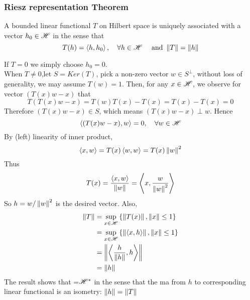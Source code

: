 \subsubsection{Riesz representation Theorem}\label{Riesz representation theory}
\begin{theorem}\rm
	A bounded linear functional $T$ on Hilbert space \hbs is uniquely associated with a vector $h_0\in \mathscr{H}$ in the sense that
	$$
		T(h)=\left<{h},{h_0}\right>,\quad\forall h\in\mathscr{H}\quad\text{ and  }\left\|{T}\right\|=\left\|{h}\right\|
	$$
	\begin{pf}{}{}
	If $T=0$ we simply choose $h_0=0$.\\
	When $T\neq0$,let $S=Ker(T)$, pick a non-zero vector $w\in S^\perp$, without loss of generality, we may assume $T(w)=1$. Then, for any $x\in \mathscr{H}$, we observe for vector $(T(x)w-x)$ that
	$$
		T\left(T(x)w-x\right)=T(w)T(x)-T(x)=T(x)-T(x)=0
	$$
	Therefore $(T(x)w-x)\in S$, which means $(T(x)w-x)\perp w$. Hence
	$$
		\left<{(T(x)w-x)},{w}\right>=0,\quad\forall w\in\mathscr{H}
	$$
	By (left) linearity of inner product,
	$$
		\left<{x},{w}\right>=T(x)\left<{w},{w}\right>=T(x)\left\|{w}\right\|^2
	$$
	Thus
	$$
		T(x)=\frac{\left<{x},{w}\right>}{\left\|{w}\right\|}=\left<{x},{\frac{w}{\left\|{w}\right\|^2}}\right>
	$$
	So $h=w/\left\|{w}\right\|^2$ is the desired vector. Also,
	\begin{equation}
		\begin{split}
			\left\|{T}\right\|&=\sup_{x\in \mathscr{H}}{\left\{\left\|{T(x)}\right\|,\left\|{x}\right\|\leq1\right\}}\\
			&=\sup_{x\in \mathscr{H}}{\left\{\left\|{\left<{x},{h}\right>}\right\|,\left\|{x}\right\|\leq1\right\}}\\
			&=\left\|{\left<{\frac{h}{\left\|{h}\right\|}},{h}\right>}\right\|\\
			&=\left\|{h}\right\|
		\end{split}
	\end{equation}
	The result shows that \hbs=${\mathscr{H}}^*$ in the sense that the ma from $h$ to corresponding linear functional is an isometry: $\left\|{h}\right\|=\left\|{T}\right\|$
\end{pf}
\end{theorem}

